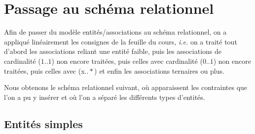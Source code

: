 \documentclass[10pt]{article}
\begin{document}
\section{Passage au schéma relationnel}

Afin de passer du modèle entités/associations au schéma relationnel, on a appliqué linéairement les consignes de la feuille du cours,
\emph{i.e.} on a traité tout d'abord les associations reliant une entité faible, puis les associations de cardinalité ($1..1$) non encore
traitées, puis celles avec cardinalité ($0..1$) non encore traitées, puis celles avec (x$..*$) et enfin les associations ternaires ou plus.

Nous obtenons le schéma relationnel suivant, où apparaissent les contraintes que l'on a pu y insérer et où l'on a séparé les différents
types d'entités.

\subsection{Entités simples}
\end{document}
